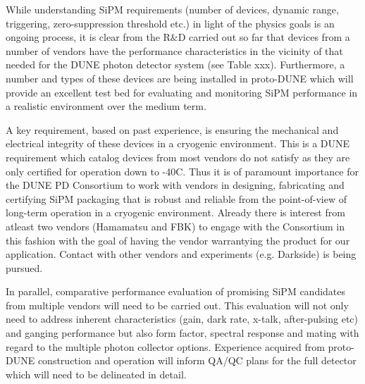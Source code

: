 
While understanding SiPM requirements (number of devices, dynamic range, triggering, 
zero-suppression threshold etc.) in light of the physics goals is an ongoing process, it is clear
from the R$\&$D carried out so far that devices from a number of vendors have the 
performance characteristics in the vicinity of that needed for the DUNE photon detector
system (see Table xxx). Furthermore, a number and types of these devices are being installed in 
proto-DUNE which will provide an excellent test bed for evaluating and monitoring SiPM
performance in a realistic environment over the medium term. 

A key requirement, based on past experience, is ensuring the mechanical and electrical 
integrity of these devices in a cryogenic environment. This is a DUNE requirement which 
catalog devices from most vendors do not satisfy as they are only certified for operation 
down to -40C. Thus it is of paramount importance for the DUNE PD Consortium to work 
with vendors in designing, fabricating and certifying SiPM packaging that is robust and
reliable from the point-of-view of long-term operation in a cryogenic environment. Already 
there is interest from atleast two vendors (Hamamatsu and FBK) to engage with the
Consortium in this fashion with the goal of having the vendor warrantying the product
for our application. Contact with other vendors and experiments (e.g. Darkside) is
being pursued.   

In parallel, comparative performance evaluation of promising SiPM candidates from
multiple vendors will need to be carried out. This evaluation will not only need to
address inherent characteristics (gain, dark rate, x-talk, after-pulsing etc) and ganging 
performance but also form factor, spectral response and mating with regard to the
multiple photon collector options. Experience acquired from proto-DUNE construction
and operation will inform QA/QC plans for the full detector which will need to be
delineated in detail.


